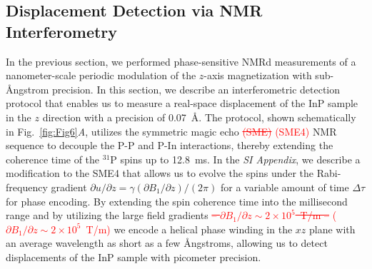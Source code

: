 \documentclass[9pt,twocolumn,twoside,lineno]{pnas-new}
\newcommand{\RB}[3][{}]{\textcolor{red}{\sout{#2} #3\ul{#1}}}
\begin{document}
\subsection*{Displacement Detection via NMR Interferometry}\label{NMR_Interferometer}
In the previous section, we performed phase-sensitive NMRd measurements of a nanometer-scale periodic modulation of the $z$-axis magnetization with sub-\AA ngstrom precision. In this section, we describe an interferometric detection protocol that enables us to measure a real-space displacement of the InP sample in the $z$ direction with a precision of 0.07~\AA. The protocol, shown schematically in Fig.~\ref{fig:Fig6}\textit{A}, utilizes the symmetric magic echo \RB{(SME)}{(SME4)} \cite{Boutis2003} NMR sequence to decouple the P-P and P-In interactions, thereby extending the coherence time of the $^{31}$P spins up to 12.8~ms. In the \textit{SI Appendix}, we describe a modification to the SME4 that allows us to evolve the spins under the Rabi-frequency gradient $\partial u/\partial z =\gamma (\partial B_1/\partial z)/(2\pi )$ for a variable amount of time $\Delta\tau$ for phase encoding. By extending the spin coherence time into the millisecond range and by utilizing the large field gradients \RB{-- $\partial B_1/\partial z \sim 2\times 10^5$~T/m --}{($\partial B_1/\partial z \sim 2\times 10^5$~T/m)} we encode a helical phase winding in the $xz$ plane with an average wavelength as short as a few \AA ngstroms, allowing us to detect displacements of the InP sample with picometer precision.
\end{document}
